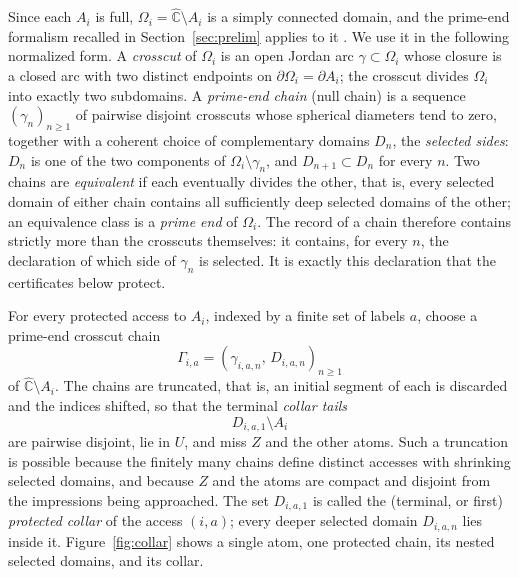 \documentclass[11pt,reqno]{amsart}
\theoremstyle{definition}
\theoremstyle{remark}
\newcommand{\Chat}{\widehat{\mathbb C}}
\begin{document}
Since each $A_i$ is full, $\Omega_i=\Chat\setminus A_i$ is a simply
connected domain, and the prime-end formalism recalled in
Section~\ref{sec:prelim} applies to it \cite{Pom92}.  We use it in the
following normalized form.  A \emph{crosscut} of $\Omega_i$ is an open
Jordan arc $\gamma\subset\Omega_i$ whose closure is a closed arc with two
distinct endpoints on $\partial\Omega_i=\partial A_i$; the crosscut divides
$\Omega_i$ into exactly two subdomains.  A \emph{prime-end chain} (null
chain) is a sequence $(\gamma_n)_{n\ge1}$ of pairwise disjoint crosscuts
whose spherical diameters tend to zero, together with a coherent choice of
complementary domains $D_n$, the \emph{selected sides}: $D_n$ is one of the
two components of $\Omega_i\setminus\gamma_n$, and $D_{n+1}\subset D_n$ for
every $n$.  Two chains are \emph{equivalent} if each eventually divides the
other, that is, every selected domain of either chain contains all
sufficiently deep selected domains of the other; an equivalence class is a
\emph{prime end} of $\Omega_i$.  The record of a chain therefore contains
strictly more than the crosscuts themselves: it contains, for every $n$,
the declaration of which side of $\gamma_n$ is selected.  It is exactly
this declaration that the certificates below protect.

For every protected access to $A_i$, indexed by a finite set of labels $a$,
choose a prime-end crosscut chain
\[
\Gamma_{i,a}=(\gamma_{i,a,n},\,D_{i,a,n})_{n\ge1}
\]
of $\Chat\setminus A_i$.  The chains are truncated, that is, an initial
segment of each is discarded and the indices shifted, so that the terminal
\emph{collar tails}
\[
D_{i,a,1}\setminus A_i
\]
are pairwise disjoint, lie in $U$, and miss $Z$ and the other atoms.  Such
a truncation is possible because the finitely many chains define distinct
accesses with shrinking selected domains, and because $Z$ and the atoms are
compact and disjoint from the impressions being approached.  The set
$D_{i,a,1}$ is called the (terminal, or first) \emph{protected collar} of
the access $(i,a)$; every deeper selected domain $D_{i,a,n}$ lies inside
it.  Figure~\ref{fig:collar} shows a single atom, one protected chain, its
nested selected domains, and its collar.
\end{document}
